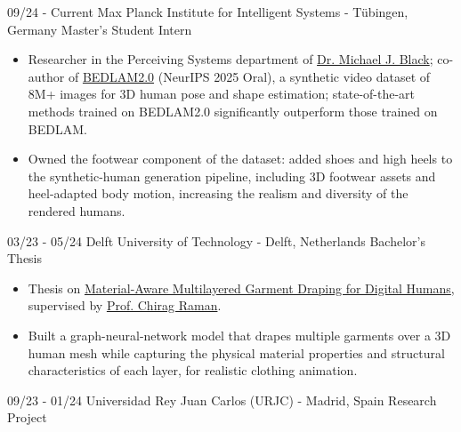 \documentclass[9pt]{developercv} %
\begin{document}
\vspace{-10 pt}
\begin{entrylist}
    \entry
        {09/24 - Current}
        {Max Planck Institute for Intelligent Systems - T\"ubingen, Germany}
        {Master's Student Intern}
        {\vspace{-10pt}
        \begin{itemize}[noitemsep,topsep=0pt,parsep=0pt,partopsep=0pt, leftmargin=-1pt]
            \item Researcher in the Perceiving Systems department of \href{https://scholar.google.com/citations?user=6NjbexEAAAAJ}{Dr. Michael J. Black}; co-author of \href{https://bedlam2.is.tue.mpg.de/}{BEDLAM2.0} (NeurIPS 2025 Oral), a synthetic video dataset of 8M+ images for 3D human pose and shape estimation; state-of-the-art methods trained on BEDLAM2.0 significantly outperform those trained on BEDLAM.
            \item Owned the footwear component of the dataset: added shoes and high heels to the synthetic-human generation pipeline, including 3D footwear assets and heel-adapted body motion, increasing the realism and diversity of the rendered humans.
        \end{itemize}
        }
    \entry
        {03/23 - 05/24}
        {Delft University of Technology - Delft, Netherlands}
        {Bachelor's Thesis}
        {\vspace{-10pt}
        \begin{itemize}[noitemsep,topsep=0pt,parsep=0pt,partopsep=0pt, leftmargin=-1pt]
            \item Thesis on \href{https://prerana-achar.github.io/assets/resources/draping.mp4}{Material-Aware Multilayered Garment Draping for Digital Humans}, supervised by \href{https://scholar.google.com/citations?user=TeoDF6MAAAAJ&hl=en}{Prof. Chirag Raman}.
            \item Built a graph-neural-network model that drapes multiple garments over a 3D human mesh while capturing the physical material properties and structural characteristics of each layer, for realistic clothing animation.
        \end{itemize}
        }
    \entry
        {09/23 - 01/24}
        {Universidad Rey Juan Carlos (URJC) - Madrid, Spain}
        {Research Project}
        {\vspace{-10pt}
}
\end{entrylist}
\end{document}
